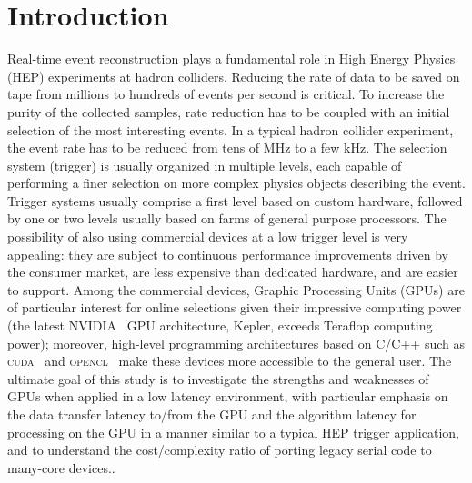 \documentclass[a4]{jpconf}
\begin{document}
\section{Introduction}
Real-time event reconstruction plays a fundamental role in High Energy
Physics (HEP) experiments at hadron colliders.  Reducing the rate of
data to be saved on tape from millions to hundreds of events per
second is critical. To increase the purity of the collected samples,
rate reduction has to be coupled with an initial selection of the most
interesting events.  In a typical hadron collider experiment, the
event rate has to be reduced from tens of MHz to a few kHz.  The
selection system (trigger) is usually organized in multiple levels,
each capable of performing a finer selection on more complex physics
objects describing the event. Trigger systems usually comprise a first
level based on custom hardware, followed by one or two levels usually
based on farms of general purpose processors.  The possibility of also
using commercial devices at a low trigger level is very appealing:
they are subject to continuous performance improvements driven by the
consumer market, are less expensive than dedicated hardware, and are
easier to support.  Among the commercial devices, Graphic Processing
Units (GPUs) are of particular interest for online selections given
their impressive computing power (the latest NVIDIA~\cite{bib_nvidia}
GPU architecture, Kepler, exceeds Teraflop computing power); moreover,
high-level programming architectures based on C/C++ such as
\textsc{cuda}~\cite{bib_cuda} and \textsc{opencl}~\cite{bib_opencl}
make these devices more accessible to the general user.  The ultimate
goal of this study is to investigate the strengths and weaknesses of
GPUs when applied in a low latency environment, with particular
emphasis on the data transfer latency to/from the GPU and the
algorithm latency for processing on the GPU in a manner similar to a
typical HEP trigger application, and to understand the cost/complexity
ratio of porting legacy serial code to many-core devices..
\end{document}
